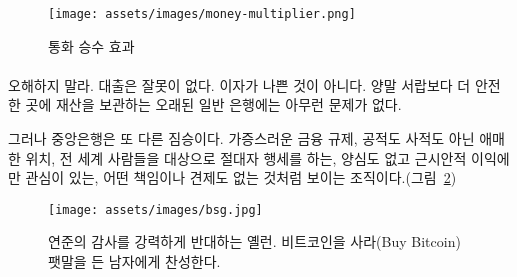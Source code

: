 \begin{comment}
	\begin{figure}
		\centering
		\texttt{[image: assets/images/money-multiplier.png]}
		\caption{The money multiplier effect}
		\label{fig:money-multiplier}
	\end{figure}
\end{comment}
\begin{figure}
	\centering
	\texttt{[image: assets/images/money-multiplier.png]}
	\caption{통화 승수 효과}
	\label{fig:money-multiplier}
\end{figure}

\paragraph{}
\begin{comment}
	Don't get me wrong: There is nothing wrong with lending. There is
	nothing wrong with interest. There isn't even anything wrong with good
	old regular banks to store your wealth somewhere more secure than in
	your sock drawer.
\end{comment}
오해하지 말라. 대출은 잘못이 없다. 이자가 나쁜 것이 아니다. 
양말 서랍보다 더 안전한 곳에 재산을 보관하는 오래된 일반 은행에는 아무런 문제가 없다. 

\begin{comment}
	Central banks, however, are a different beast. Abominations of financial
	regulation, half public half private, playing god with something which
	affects everyone who is part of our global civilization, without a
	conscience, only interested in the immediate future, and seemingly
	without any accountability or auditability (see Figure~\ref{fig:bsg}).
\end{comment}
그러나 중앙은행은 또 다른 짐승이다. 
가증스러운 금융 규제, 공적도 사적도 아닌 애매한 위치, 
전 세계 사람들을 대상으로 절대자 행세를 하는, 양심도 없고 근시안적 이익에만 관심이 있는, 
어떤 책임이나 견제도 없는 것처럼 보이는 조직이다.(그림~\ref{fig:bsg})

\begin{comment}
	\begin{figure}
		\centering
		\texttt{[image: assets/images/bsg.jpg]}
		\caption{Yellen is strongly opposed to audit the Fed, while Bitcoin Sign Guy is strongly in favor of buying bitcoin.}
		\label{fig:bsg}
	\end{figure}
\end{comment}
\begin{figure}
	\centering
	\texttt{[image: assets/images/bsg.jpg]}
	\caption{연준의 감사를 강력하게 반대하는 옐런. 비트코인을 사라(Buy Bitcoin) 팻말을 든 남자에게 찬성한다.}
	\label{fig:bsg}
\end{figure}

